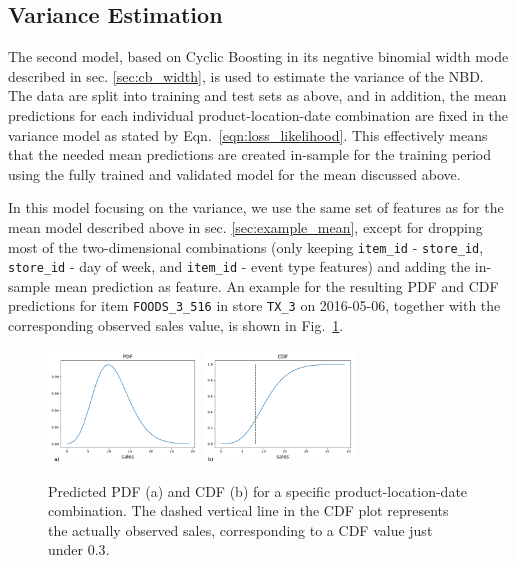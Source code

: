 \documentclass[BCOR=1mm, DIV=calc,10pt,
twoside=true,
twocolumn,
headings=normal]{scrartcl}
\newcommand{\fig}{Fig.~}
\newcommand{\eqn}{Eqn.~}
\begin{document}
\subsection{Variance Estimation}

The second model, based on Cyclic Boosting in its negative binomial width mode described in sec. \ref{sec:cb_width}, is used to estimate the variance of the NBD. The data are split into training and test sets as above, and in addition, the mean predictions for each individual product-location-date combination are fixed in the variance model as stated by \eqn \eqref{eqn:loss_likelihood}. This effectively means that the needed mean predictions are created in-sample for the training period using the fully trained and validated model for the mean discussed above.

\noindent
In this model focusing on the variance, we use the same set of features as for the mean model described above in sec. \ref{sec:example_mean}, except for dropping most of the two-dimensional combinations (only keeping \texttt{item\_id} - \texttt{store\_id}, \texttt{store\_id} - day of week, and \texttt{item\_id} - event type features) and adding the in-sample mean prediction as feature. An example for the resulting PDF and CDF predictions for item \texttt{FOODS\_3\_516} in store \texttt{TX\_3} on 2016-05-06, together with the corresponding observed sales value, is shown in \fig \ref{fig:pdf_example}.

\begin{figure}
\begin{center}
\includegraphics[width=4cm]{pdf}
\includegraphics[width=4cm]{cdf}
\caption{\label{fig:pdf_example} Predicted PDF (a) and CDF (b) for a specific product-location-date combination. The dashed vertical line in the CDF plot represents the actually observed sales, corresponding to a CDF value just under $0.3$.}
\end{center}
\end{figure}
\end{document}
